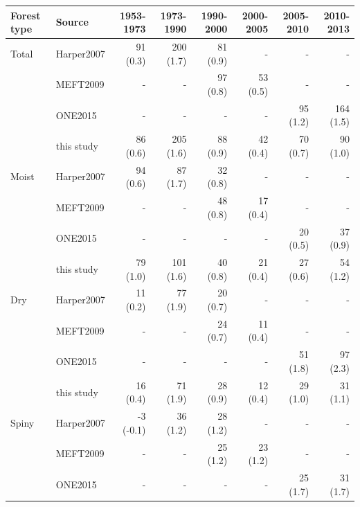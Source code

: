 \documentclass[a4paper, 12pt, leqno]{article} %
\begin{document}
\begin{table}[!h]
  \begin{longtable}[]{@{}llrrrrrr@{}}
    \toprule
    Forest type & Source & 1953-1973 & 1973-1990 & 1990-2000 & 2000-2005 &
    2005-2010 & 2010-2013 \\
    \midrule
    \endhead
    Total & Harper2007 & 91 (0.3) & 200 (1.7) & 81 (0.9) & - & - &
                                                                   - \\
                & MEFT2009 & - & - & 97 (0.8) & 53 (0.5) & - & - \\
                & ONE2015 & - & - & - & - & 95 (1.2) & 164 (1.5) \\
                & this study & 86 (0.6) & 205 (1.6) & 88 (0.9) & 42 (0.4) & 70 (0.7) &
                                                                                       90 (1.0) \\
    Moist & Harper2007 & 94 (0.6) & 87 (1.7) & 32 (0.8) & - & - &
                                                                  - \\
                & MEFT2009 & - & - & 48 (0.8) & 17 (0.4) & - & - \\
                & ONE2015 & - & - & - & - & 20 (0.5) & 37 (0.9) \\
                & this study & 79 (1.0) & 101 (1.6) & 40 (0.8) & 21 (0.4) & 27 (0.6) &
                                                                                       54 (1.2) \\
    Dry & Harper2007 & 11 (0.2) & 77 (1.9) & 20 (0.7) & - & - &
                                                                - \\
                & MEFT2009 & - & - & 24 (0.7) & 11 (0.4) & - & - \\
                & ONE2015 & - & - & - & - & 51 (1.8) & 97 (2.3) \\
                & this study & 16 (0.4) & 71 (1.9) & 28 (0.9) & 12 (0.4) & 29 (1.0) & 31
                                                                                      (1.1) \\
    Spiny & Harper2007 & -3 (-0.1) & 36 (1.2) & 28 (1.2) & - & - &
                                                                   - \\
                & MEFT2009 & - & - & 25 (1.2) & 23 (1.2) & - & - \\
                & ONE2015 & - & - & - & - & 25 (1.7) & 31 (1.7) \\

\end{longtable}
\end{table}
\end{document}

